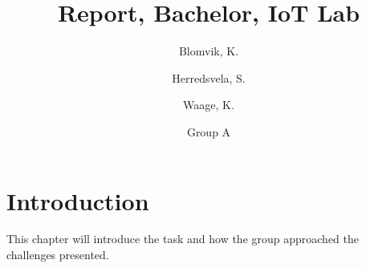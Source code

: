 \documentclass{article}
\title{Report, Bachelor, IoT Lab}
\author{Blomvik, K.  \and Herredsvela, S. \and Waage, K.}
\date{Group A}
\begin{document}
\maketitle

\vspace{4em}

\tableofcontents

\newpage
\section{Introduction}

This chapter will introduce the task and how the group approached the challenges presented.
\end{document}
